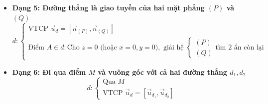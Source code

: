 \documentclass[12pt,a4paper]{article}
\begin{document}
\begin{theorybox}
\begin{itemize}
        \item \textbf{Dạng 5: Đường thẳng là giao tuyến của hai mặt phẳng $(P)$ và $(Q)$}
        \[
            d\colon \begin{cases} \text{VTCP } \vec{u}_d = [\vec{n}_{(P)}, \vec{n}_{(Q)}] \\ \text{Điểm } A \in d\colon \text{Cho } z=0 \text{ (hoặc } x=0, y=0\text{)}, \text{ giải hệ } \begin{cases} (P) \\ (Q) \end{cases} \text{tìm 2 ẩn còn lại} \end{cases}
        \]

        \item \textbf{Dạng 6: Đi qua điểm $M$ và vuông góc với cả hai đường thẳng $d_1, d_2$}
        \[
            d\colon \begin{cases} \text{Qua } M \\ \text{VTCP } \vec{u}_d = [\vec{u}_{d_1}, \vec{u}_{d_2}] \end{cases}
        \]
    \end{itemize}
\end{theorybox}

\newpage
\end{document}
